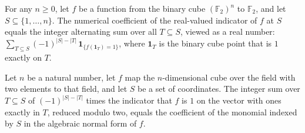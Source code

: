 \begin{theorem}
\label{FABL.numericalCoeff_booleanRealEmbedding_eq_intCast}
\leanok
{}
For any $n\ge 0$, let $f$ be a function from the binary cube $(\mathbb{F}_2)^n$ to
$\mathbb{F}_2$, and let $S\subseteq\{1,\ldots,n\}$. The numerical coefficient of the
real-valued indicator of $f$ at $S$ equals the integer alternating sum over all
$T\subseteq S$, viewed as a real number: $\displaystyle \sum_{T\subseteq
S}(-1)^{|S|-|T|}\,\mathbf{1}_{\{f(\mathbf{1}_T)=1\}}$, where $\mathbf{1}_T$ is the
binary cube point that is $1$ exactly on $T$.
\end{theorem}

\begin{theorem}
\leanok
{}
Let $n$ be a natural number, let $f$ map the $n$-dimensional cube over the field with
two elements to that field, and let $S$ be a set of coordinates. The integer sum over
$T\subseteq S$ of $(-1)^{|S|-|T|}$ times the indicator that $f$ is $1$ on the vector
with ones exactly in $T$, reduced modulo two, equals the coefficient of the monomial
indexed by $S$ in the algebraic normal form of $f$.
\end{theorem}

